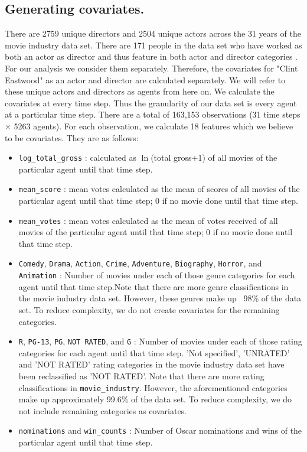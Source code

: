 \documentclass{article}
\begin{document}
\subsection{Generating covariates.}

There are 2759 unique directors and 2504 unique actors across the 31 years of the movie industry data set. There are 171 people in the data set who have worked as both an actor as director and thus feature in both actor and director categories . For our analysis we consider them separately. Therefore, the covariates for "Clint Eastwood" as an actor and director are calculated separately. We will refer to these unique actors and directors as agents from here on. We calculate the covariates at every time step. Thus the granularity of our data set is every agent at a particular time step. There are a total of 163,153 observations (31 time steps $\times$ 5263 agents). For each observation, we calculate 18 features which we believe to be covariates. They are as follows:

\begin{itemize}
  \item \texttt{log\_total\_gross} : calculated as $\ln$(total gross+1) of all movies of the particular agent until that time step.
  \item \texttt{mean\_score} : mean votes calculated as the mean of scores of all movies of the particular agent until that time step; 0 if no movie done until that time step.
  \item \texttt{mean\_votes} : mean votes calculated as the mean of votes received of all movies of the particular agent until that time step; 0 if no movie done until that time step.
  \item \texttt{Comedy}, \texttt{Drama}, \texttt{Action}, \texttt{Crime}, \texttt{Adventure}, \texttt{Biography}, \texttt{Horror}, and \texttt{Animation} : Number of movies under each of those genre categories for each agent until that time step.Note that there are more genre classifications in the movie industry data set. However, these genres make up ~98\% of the data set. To reduce complexity, we do not create covariates for the remaining categories.
  \item \texttt{R}, \texttt{PG-13}, \texttt{PG}, \texttt{NOT RATED}, and \texttt{G} : Number of movies under each of those rating categories for each agent until that time step. 'Not specified', 'UNRATED' and 'NOT RATED' rating categories in the movie industry data set have been reclassified as 'NOT RATED'. Note that there are more rating classifications in \texttt{movie\_industry}. However, the aforementioned categories make up approximately 99.6\% of the data set. To reduce complexity, we do not include remaining categories as covariates.
  \item \texttt{nominations} and \texttt{win\_counts} : Number of Oscar nominations and wins of the particular agent until that time step.
  
\end{itemize}
\end{document}
